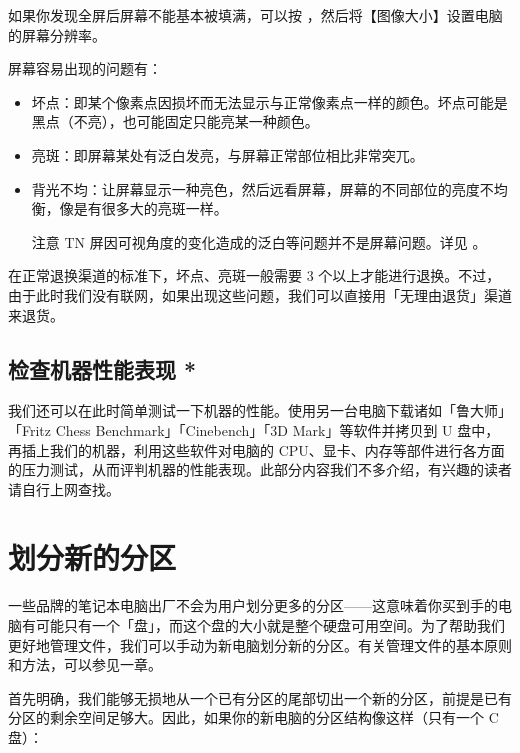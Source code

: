 \begin{note}
  如果你发现全屏后屏幕不能基本被填满，可以按 ，然后将【图像大小】设置电脑的屏幕分辨率。
\end{note}

屏幕容易出现的问题有：

\begin{itemize}
  \item 坏点：即某个像素点因损坏而无法显示与正常像素点一样的颜色。坏点可能是黑点（不亮），也可能固定只能亮某一种颜色。
  \item 亮斑：即屏幕某处有泛白发亮，与屏幕正常部位相比非常突兀。
  \item 背光不均：让屏幕显示一种亮色，然后远看屏幕，屏幕的不同部位的亮度不均衡，像是有很多大的亮斑一样。
  \begin{note}
    注意 TN 屏因可视角度的变化造成的泛白等问题并不是屏幕问题。详见 。
  \end{note}
\end{itemize}

在正常退换渠道的标准下，坏点、亮斑一般需要 3 个以上才能进行退换。不过，由于此时我们没有联网，如果出现这些问题，我们可以直接用「无理由退货」渠道来退货。

\subsection{检查机器性能表现 *}

我们还可以在此时简单测试一下机器的性能。使用另一台电脑下载诸如「鲁大师」「Fritz Chess Benchmark」「Cinebench」「3D Mark」等软件并拷贝到 U 盘中，再插上我们的机器，利用这些软件对电脑的 CPU、显卡、内存等部件进行各方面的压力测试，从而评判机器的性能表现。此部分内容我们不多介绍，有兴趣的读者请自行上网查找。

\section{划分新的分区}

一些品牌的笔记本电脑出厂不会为用户划分更多的分区——这意味着你买到手的电脑有可能只有一个「盘」，而这个盘的大小就是整个硬盘可用空间。为了帮助我们更好地管理文件，我们可以手动为新电脑划分新的分区。有关管理文件的基本原则和方法，可以参见一章。

首先明确，我们能够无损地从一个已有分区的尾部切出一个新的分区，前提是已有分区的剩余空间足够大。因此，如果你的新电脑的分区结构像这样（只有一个 C 盘）：


